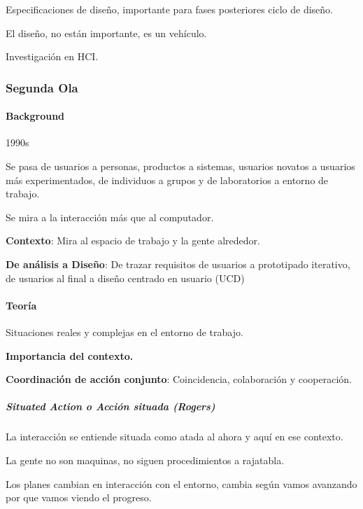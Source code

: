Especificaciones de diseño, importante para fases posteriores ciclo de
diseño.

El diseño, no están importante, es un vehículo.

Investigación en HCI.

\hypertarget{segunda-ola}{%
\subsubsection{Segunda Ola}\label{segunda-ola}}

\hypertarget{background-1}{%
\paragraph{Background}\label{background-1}}

1990s

Se pasa de usuarios a personas, productos a sistemas, usuarios novatos a
usuarios más experimentados, de individuos a grupos y de laboratorios a
entorno de trabajo.

Se mira a la interacción más que al computador.

\textbf{Contexto}: Mira al espacio de trabajo y la gente alrededor.

\textbf{De análisis a Diseño}: De trazar requisitos de usuarios a
prototipado iterativo, de usuarios al final a diseño centrado en usuario
(UCD)

\hypertarget{teoruxeda-1}{%
\paragraph{Teoría}\label{teoruxeda-1}}

Situaciones reales y complejas en el entorno de trabajo.

\textbf{Importancia del contexto.}

\textbf{Coordinación de acción conjunto}: Coincidencia, colaboración y
cooperación.

\hypertarget{situated-action-o-acciuxf3n-situada-rogers}{%
\subparagraph{Situated Action o Acción situada
(Rogers)}\label{situated-action-o-acciuxf3n-situada-rogers}}

La interacción se entiende situada como atada al ahora y aquí en ese
contexto.

La gente no son maquinas, no siguen procedimientos a rajatabla.

Los planes cambian en interacción con el entorno, cambia según vamos
avanzando por que vamos viendo el progreso.

